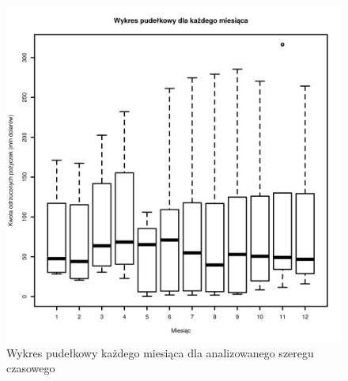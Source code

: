 \documentclass[11pt]{article}
\begin{document}
\begin{figure}[h]

    \centering
	\includegraphics[width=\textwidth]{images/data_monthly_train_pudelkowy.png}
    \caption{Wykres pudełkowy każdego miesiąca dla analizowanego szeregu czasowego}
    \label{fig:data_monthly_train_pudelkowy}

\end{figure}

\newpage
\end{document}
